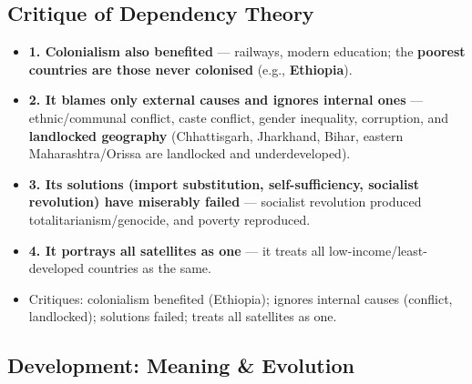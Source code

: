 \sectiondivider

\subsection{Critique of Dependency Theory}

\begin{CriticalPoint}
\begin{itemize}
    \item \textbf{1. Colonialism also benefited} --- railways, modern education; the \textbf{poorest countries are those never colonised} (e.g., \textbf{Ethiopia}).
    \item \textbf{2. It blames only external causes and ignores internal ones} --- ethnic/communal conflict, caste conflict, gender inequality, corruption, and \textbf{landlocked geography} (Chhattisgarh, Jharkhand, Bihar, eastern Maharashtra/Orissa are landlocked and underdeveloped).
    \item \textbf{3. Its solutions (import substitution, self-sufficiency, socialist revolution) have miserably failed} --- socialist revolution produced totalitarianism/genocide, and poverty reproduced.
    \item \textbf{4. It portrays all satellites as one} --- it treats all low-income/least-developed countries as the same.
\end{itemize}
\end{CriticalPoint}

\begin{QuickRevision}
\begin{itemize}
    \item Critiques: colonialism benefited (Ethiopia); ignores internal causes (conflict, landlocked); solutions failed; treats all satellites as one.
\end{itemize}
\end{QuickRevision}

\sectiondivider

\subsection{Development: Meaning \& Evolution}

